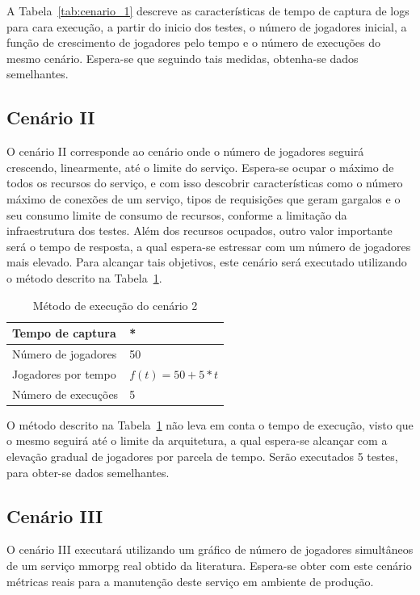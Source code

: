 A Tabela~\ref{tab:cenario_1} descreve as características de tempo de captura de logs para cara execução, a partir do inicio dos testes, o número de jogadores inicial, a função de crescimento de jogadores pelo tempo e o número de execuções do mesmo cenário.
%
Espera-se que seguindo tais medidas, obtenha-se dados semelhantes.


\subsection{Cenário II}

O cenário II corresponde ao cenário onde o número de jogadores seguirá crescendo, linearmente, até o limite do serviço.
%
Espera-se ocupar o máximo de todos os recursos do serviço, e com isso descobrir características como o número máximo de conexões de um serviço, tipos de requisições que geram gargalos e o seu consumo limite de consumo de recursos, conforme a limitação da infraestrutura dos testes.
%
Além dos recursos ocupados, outro valor importante será o tempo de resposta, a qual espera-se estressar com um número de jogadores mais elevado.
%
Para alcançar tais objetivos, este cenário será executado utilizando o método descrito na Tabela~\ref{tab:cenario_2}.

\begin{table}[htb!]
\centering
\caption{Método de execução do cenário 2}
\label{tab:cenario_2}
\begin{tabular}{|l|l|}
\hline
Tempo de captura    &    *              \\ \hline
Número de jogadores & 50                \\ \hline
Jogadores por tempo & $f(t) = 50 + 5*t$ \\ \hline
Número de execuções & 5                 \\ \hline 
\end{tabular}
\end{table}

O método descrito na Tabela~\ref{tab:cenario_2} não leva em conta o tempo de execução, visto que o mesmo seguirá até o limite da arquitetura, a qual espera-se alcançar com a elevação gradual de jogadores por parcela de tempo.
%
Serão executados 5 testes, para obter-se dados semelhantes.

\subsection{Cenário III}

O cenário III executará utilizando um gráfico de número de jogadores simultâneos de um serviço \ac{mmorpg} real obtido da literatura.
%
Espera-se obter com este cenário métricas reais para a manutenção deste serviço em ambiente de produção.

